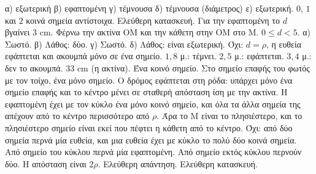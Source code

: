  α) εξωτερική \quad β) εφαπτομένη \quad γ) τέμνουσα \quad δ) τέμνουσα (διάμετρος) \quad ε) εξωτερική.
 $0$, $1$ και $2$ κοινά σημεία αντίστοιχα.
 Ελεύθερη κατασκευή. Για την εφαπτομένη το $d$ βγαίνει $3$ cm.
 Φέρνω την ακτίνα $\mathrm{ΟΜ}$ και την κάθετη στην $\mathrm{ΟΜ}$ στο $\mathrm{Μ}$.
 $0\le d<5$.
 α) Σωστό. β) Λάθος: δύο. γ) Σωστό. δ) Λάθος: είναι εξωτερική.
 Όχι: $d=\rho$, η ευθεία εφάπτεται και ακουμπά μόνο σε ένα σημείο.
 $1{,}8$ μ.: τέμνει. $2{,}5$ μ.: εφάπτεται. $3{,}4$ μ.: δεν το ακουμπά.
 $33$ cm (η ακτίνα). Ένα κοινό σημείο.
 Στο σημείο επαφής του φωτός με τον τοίχο, ένα μόνο σημείο.
 Ο δρόμος εφάπτεται στη ρόδα: υπάρχει μόνο ένα σημείο επαφής και το κέντρο μένει σε σταθερή απόσταση ίση με την ακτίνα.
 Η εφαπτομένη έχει με τον κύκλο ένα μόνο κοινό σημείο, και όλα τα άλλα σημεία της απέχουν από το κέντρο περισσότερο από $\rho$. Άρα το $\mathrm{Μ}$ είναι το πλησιέστερο, και το πλησιέστερο σημείο είναι εκεί που πέφτει η κάθετη από το κέντρο.
 Όχι: από δύο σημεία περνά μία ευθεία, και μια ευθεία έχει με κύκλο το πολύ δύο κοινά σημεία.
 Από σημείο του κύκλου περνά μία εφαπτομένη. Από σημείο εκτός κύκλου περνούν δύο.
 Η απόσταση είναι $2\rho$.
 Ελεύθερη απάντηση.
 Ελεύθερη κατασκευή.
